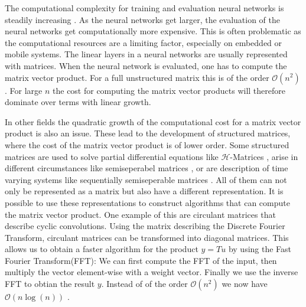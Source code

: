 \documentclass[doctype=mastersthesis,BCOR=15mm,biblatex]{ldvbook}%
\newcommand{\bigO}{\mathscr{O}}
\begin{document}
The computational complexity for training and evaluation neural networks is steadily increasing \cite{Schwartz_green_2020}.
As the neural networks get larger, the evaluation of the neural networks get computationally more expensive. This is often problematic as the computational resources are a limiting factor, especially on embedded or mobile systems.
The linear layers in a neural networks are usually represented with matrices.
When the neural network is evaluated, one has to compute the matrix vector product.
For a full unstructured matrix this is of the order $\bigO(n^2)$ \cite{hackbusch_hierarchische_2009}.
For large $n$ the cost for computing the matrix vector products will therefore dominate over terms with linear growth.

In other fields the quadratic growth of the computational cost for a matrix vector product is also an issue.
These lead to the development of structured matrices, where the cost of the matrix vector product is of lower order.
Some structured matrices are used to solve partial differential equations like $\mathcal{H}$-Matrices \cite{grasedyck_theorie_2001}, arise in different circumstances like semiseperabel matrices \cite{vandebril_bibliography_2005}, 
or are description of time varying systems like sequentially semiseperable matrices \cite{dewilde_time-varying_1998}.
All of them can not only be represented as a matrix but also have a different representation.
It is possible to use these representations to construct algorithms that can compute the matrix vector product.
One example of this are circulant matrices that describe cyclic convolutions.
Using the matrix describing the Discrete Fourier Transform, circulant matrices can be transformed into diagonal matrices.
This allows us to obtain a faster algorithm for the product $y=Tu$ by using the Fast Fourier Transform(FFT):
We can first compute the FFT of the input, then multiply the vector element-wise with a weight vector. Finally we use the inverse FFT to obtian the result $y$.
Instead of of the order $\bigO(n^2)$ we now have $\bigO(n\log(n))$ \cite{strang_computational_2007}.
\end{document}
